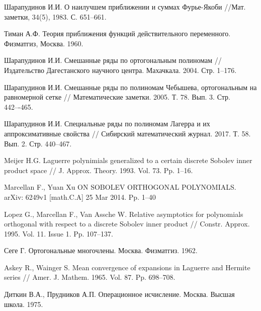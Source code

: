 \begin{thebibliography}{20}
{Шарапудинов И.И.}
О наилучшем приближении и суммах Фурье-Якоби
//Мат. заметки, 34(5), 1983. С. 651--661.



{Тиман А.Ф.} Теория приближения функций действительного переменного. Физматгиз, Москва. 1960.



{Шарапудинов И.И.}
Смешанные ряды по ортогональным полиномам // Издательство Дагестанского научного центра. Махачкала. 2004. Стр. 1--176.



{Шарапудинов И.И.}
Смешанные ряды по полиномам Чебышева, ортогональным на равномерной сетке // Математические заметки. 2005. Т. 78. Вып. 3. Стр. 442–-465.



{Шарапудинов И.И.}
Специальные ряды по полиномам Лагерра и их аппроксимативные свойства // Сибирский математический журнал. 2017. Т. 58. Вып. 2. Стр. 440--467.



{Meijer H.G.}
Laguerre polynimials generalized to a certain discrete Sobolev inner product space // J. Approx. Theory. 1993. Vol. 73. Pp. 1--16.



{Marcellan F., Yuan Xu}
ON SOBOLEV ORTHOGONAL POLYNOMIALS. arXiv: 6249v1 [math.C.A] 25 Mar 2014. Pp. 1--40



{Lopez G., Marcellan F., Van Assche W.}
Relative asymptotics for polynomials orthogonal with respect to a discrete Sobolev inner product // Constr. Approx. 1995. Vol. 11. Issue 1. Pp. 107--137.



{Сеге Г.}
Ортогональные многочлены. Москва. Физматгиз. 1962.



{Askey R., Wainger S.}
Mean convergence of expansions in Laguerre and Hermite series // Amer. J. Mathem. 1965. Vol. 87. Pp. 698--708.



{Диткин В.А., Прудников А.П.}
Операционное исчисление. Москва. Высшая школа. 1975.




\end{thebibliography}
